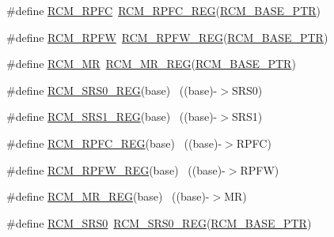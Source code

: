 \begin{DoxyCompactItemize}
\item 
\#define \hyperlink{group___r_c_m___register___accessor___macros_ga1c19f66051e218d534efc33ec09cc461}{R\+C\+M\+\_\+\+R\+P\+FC}~\hyperlink{group___r_c_m___register___accessor___macros_gaa5beb3c127ae8e82881dbd558ddf4ffb}{R\+C\+M\+\_\+\+R\+P\+F\+C\+\_\+\+R\+EG}(\hyperlink{group___r_c_m___peripheral_ga25ab3aa8d593d455ed36a52c77f88234}{R\+C\+M\+\_\+\+B\+A\+S\+E\+\_\+\+P\+TR})
\item 
\#define \hyperlink{group___r_c_m___register___accessor___macros_ga4cf7545d65e6e6c3e1848b7687d8f367}{R\+C\+M\+\_\+\+R\+P\+FW}~\hyperlink{group___r_c_m___register___accessor___macros_ga5dd502e0c3bac4f307fbb65d51bcf2c7}{R\+C\+M\+\_\+\+R\+P\+F\+W\+\_\+\+R\+EG}(\hyperlink{group___r_c_m___peripheral_ga25ab3aa8d593d455ed36a52c77f88234}{R\+C\+M\+\_\+\+B\+A\+S\+E\+\_\+\+P\+TR})
\item 
\#define \hyperlink{group___r_c_m___register___accessor___macros_ga98ac6d022fbfe501bcc3555e2cd2ebbe}{R\+C\+M\+\_\+\+MR}~\hyperlink{group___r_c_m___register___accessor___macros_ga1d8c54f5dc3a71defe562b00ec97fd40}{R\+C\+M\+\_\+\+M\+R\+\_\+\+R\+EG}(\hyperlink{group___r_c_m___peripheral_ga25ab3aa8d593d455ed36a52c77f88234}{R\+C\+M\+\_\+\+B\+A\+S\+E\+\_\+\+P\+TR})
\item 
\#define \hyperlink{group___r_c_m___register___accessor___macros_ga9a66988adfb5c993ce955b8ca7ddaa27}{R\+C\+M\+\_\+\+S\+R\+S0\+\_\+\+R\+EG}(base)                                          ~((base)-\/$>$S\+R\+S0)
\item 
\#define \hyperlink{group___r_c_m___register___accessor___macros_gac6b0aff57a904ff809da2670a9b1992a}{R\+C\+M\+\_\+\+S\+R\+S1\+\_\+\+R\+EG}(base)                                          ~((base)-\/$>$S\+R\+S1)
\item 
\#define \hyperlink{group___r_c_m___register___accessor___macros_gaa5beb3c127ae8e82881dbd558ddf4ffb}{R\+C\+M\+\_\+\+R\+P\+F\+C\+\_\+\+R\+EG}(base)                                          ~((base)-\/$>$R\+P\+FC)
\item 
\#define \hyperlink{group___r_c_m___register___accessor___macros_ga5dd502e0c3bac4f307fbb65d51bcf2c7}{R\+C\+M\+\_\+\+R\+P\+F\+W\+\_\+\+R\+EG}(base)                                          ~((base)-\/$>$R\+P\+FW)
\item 
\#define \hyperlink{group___r_c_m___register___accessor___macros_ga1d8c54f5dc3a71defe562b00ec97fd40}{R\+C\+M\+\_\+\+M\+R\+\_\+\+R\+EG}(base)                                              ~((base)-\/$>$MR)
\item 
\#define \hyperlink{group___r_c_m___register___accessor___macros_gaae0200bfd0eb1d7f7fd0d142c21fe92a}{R\+C\+M\+\_\+\+S\+R\+S0}~\hyperlink{group___r_c_m___register___accessor___macros_ga9a66988adfb5c993ce955b8ca7ddaa27}{R\+C\+M\+\_\+\+S\+R\+S0\+\_\+\+R\+EG}(\hyperlink{group___r_c_m___peripheral_ga25ab3aa8d593d455ed36a52c77f88234}{R\+C\+M\+\_\+\+B\+A\+S\+E\+\_\+\+P\+TR})

\end{DoxyCompactItemize}

